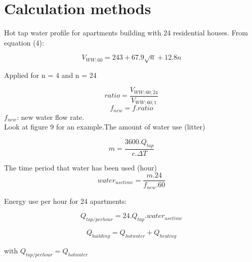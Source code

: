 \section{Calculation methods}
	
Hot tap water profile for apartments building with 24 residential houses.
From equation (4):
	
\[V_{WW;60} = 243 + 67.9\sqrt{n} + 12.8n\]
	
Applied for n = 4 and n = 24
	
\[ratio =\frac{V_{WW;60;24}}{V_{WW;60;1}}\]
\[f_{new} =f.ratio\]
$f_{new}$: new water flow rate.\\
Look at figure 9 for an example.The amount of water use (litter)
	
\[m = \frac{3600.Q_{tap}}{c.\Delta T}\]
	
The time period that water has been used (hour)
\[water_{usetime} = \frac{m.24}{f_{new}.60}\]
	
Energy use per hour for 24 apartments:
	
\[Q_{tap/perhour} = 24.Q_{tap}.water_{usetime}\]
	
\[Q_{building} = Q_{hotwater} + Q_{heating}\]
	
with $Q_{tap/perhour} = Q_{hotwater}$

	
	